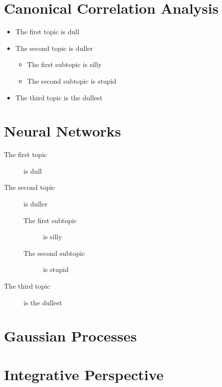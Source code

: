 \section{Canonical Correlation Analysis}
\begin{itemize}
\item The first topic is dull
\item The second topic is duller
\begin{itemize}
\item The first subtopic is silly
\item The second subtopic is stupid
\end{itemize}
\item The third topic is the dullest
\end{itemize}

\section{Neural Networks}
\begin{description}
\item[The first topic] is dull
\item[The second topic] is duller
\begin{description}
\item[The first subtopic] is silly
\item[The second subtopic] is stupid
\end{description}
\item[The third topic] is the dullest
\end{description}

\section{Gaussian Processes}


\section{Integrative Perspective}

\clearpage

